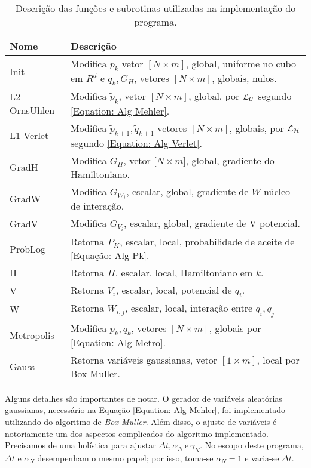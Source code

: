 \begin{table}[ht]
	\centering
	\begin{tabular}{ |p{2.6cm}||p{12cm}|  }
		\hline
		Nome & Descrição \\ 
		\hline
		\hline
		Init   		  	 & 
		Modifica ${p}_{k}$ vetor $[N\times m]$, global, uniforme no cubo em $R^d$ e ${q}_{k}, G_H$, vetores $[N\times m]$, globais, nulos. \\
		\hline
		L2-OrnsUhlen 	 & 
		Modifica $\tilde{p}_k$, vetor $[N\times m]$, global, por $\operatorname{\mathcal{L}}_U$ segundo \eqref{Equation: Alg Mehler}. \\
		\hline
		L1-Verlet  	 	 & 
		Modifica $\tilde{p}_{k+1},\tilde{q}_{k+1}$ vetores $[N\times m]$, globais, por $\operatorname{\mathcal{L}}_{\operatorname{\mathcal{H}}}$ segundo \eqref{Equation: Alg Verlet}.	\\
		\hline
		GradH         	 & 
		Modifica $G_H$, vetor $[N\times m$], global, gradiente do Hamiltoniano.					\\
		\hline
		GradW        	 &
		Modifica $G_{W_i}$, escalar, global, gradiente de $W$ núcleo de interação.	\\
		\hline
		GradV  	      	 &
		Modifica $G_{V_i}$, escalar, global, gradiente de $\operatorname{V}$ potencial.		                    \\
		\hline
		ProbLog       		 &
		Retorna $P_K$, escalar, local, probabilidade de aceite de \eqref{Equação: Alg Pk}. \\
		\hline
		H              	 &
		Retorna $H$, escalar, local, Hamiltoniano em $k$.	 							\\
		\hline
		V  	      			 &
		Retorna $V_i$, escalar, local, potencial de $q_i$.								\\
		\hline
		W         	  		 & 
		Retorna $W_{i,j}$, escalar, local, interação entre $q_i,q_j$ 							\\
		\hline
		Metropolis     	 & 
		Modifica ${p}_{k},{q}_{k}$, vetores $[N\times m]$, globais por \eqref{Equation: Alg Metro}.								\\
		\hline
		Gauss     	 & 
		Retorna variáveis gaussianas, vetor $[1\times m]$, local por Box-Muller.								\\
		\hline
	\end{tabular}
	\caption{ Descrição das funções e subrotinas utilizadas na implementação do programa.}
	\label{Table: Funcoes e Subrotinas}
\end{table}

 Alguns detalhes são importantes de notar. O gerador de variáveis aleatórias gaussianas, necessário na Equação \eqref{Equation: Alg Mehler}, foi implementado utilizando do algoritmo de \textit{Box-Muller}. Além disso, o ajuste de variáveis é notoriamente um dos aspectos complicados do algoritmo implementado. Precisamos de uma holística para ajustar $\Delta t, \alpha_N \ \text{e} \ \gamma_N$. No escopo deste programa, $\Delta t$ e $\alpha_N$ desempenham o mesmo papel; por isso, toma-se $\alpha_N = 1$ e varia-se $\Delta t$. 
 
